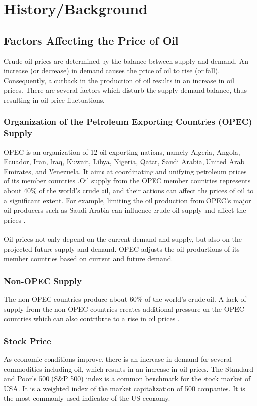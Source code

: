 \documentclass[runningheads]{llncs}
\begin{document}
\section{History/Background}
\subsection{Factors Affecting the Price of Oil}
Crude oil prices are determined by the balance between supply and demand. An increase (or decrease) in demand causes the price of oil to rise (or fall). Consequently, a cutback in the production of oil results in an increase in oil prices. There are several factors which disturb the supply-demand balance, thus resulting in oil price fluctuations. 

\subsubsection{Organization of the Petroleum Exporting Countries (OPEC) Supply}
OPEC is an organization of 12 oil exporting nations, namely Algeria, Angola, Ecuador, Iran, Iraq, Kuwait, Libya, Nigeria, Qatar, Saudi Arabia, United Arab Emirates, and Venezuela. It aims at coordinating and unifying petroleum prices of its member countries \cite{opec}.Oil supply from the OPEC member countries represents about 40\% of the world’s crude oil, and their actions can affect the prices of oil to a significant extent. For example, limiting the oil production from OPEC’s major oil producers such as Saudi Arabia can influence crude oil supply and affect the prices \cite{eiafactors}.\\\\ 
\noindent Oil prices not only depend on the current demand and supply, but also on the projected future supply and demand. OPEC adjusts the oil productions of its member countries based on current and future demand.

\subsubsection{Non-OPEC Supply}
The non-OPEC countries produce about 60\% of the world's crude oil. A lack of supply from the non-OPEC countries creates additional pressure on the OPEC countries which can also contribute to a rise in oil prices \cite{eiafactors}.

\subsubsection{Stock Price}
As economic conditions improve, there is an increase in demand for several commodities including oil, which results in an increase in oil prices. The Standard and Poor's 500 (S\&P 500) index is a common benchmark for the stock market of USA. It is a weighted index of the market capitalization of 500 companies. It is the most commonly used indicator of the US economy.
\end{document}
